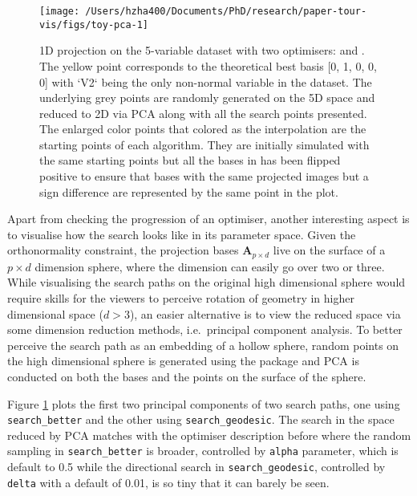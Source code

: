 \begin{Schunk}
\begin{figure}

{\centering \texttt{[image: /Users/hzha400/Documents/PhD/research/paper-tour-vis/figs/toy-pca-1]} 

}

\caption{1D projection on the 5-variable dataset  with two optimisers:  and . The yellow point corresponds to the theoretical best basis [0, 1, 0, 0, 0] with `V2` being the only non-normal variable in the dataset.  The underlying grey points are randomly generated on the 5D space and reduced to 2D via PCA along with all the search points presented. The enlarged color points that colored as the interpolation are the starting points of each algorithm. They are initially simulated with the same starting points but all the bases in  has been flipped positive to ensure that bases with the same projected images but a sign difference are represented by the same point in the plot.}\label{fig:toy-pca}
\end{figure}
\end{Schunk}

Apart from checking the progression of an optimiser, another interesting
aspect is to visualise how the search looks like in its parameter space.
Given the orthonormality constraint, the projection bases
\(\mathbf{A}_{p \times d}\) live on the surface of a \(p \times d\)
dimension sphere, where the dimension can easily go over two or three.
While visualising the search paths on the original high dimensional
sphere would require skills for the viewers to perceive rotation of
geometry in higher dimensional space (\(d > 3\)), an easier alternative
is to view the reduced space via some dimension reduction methods,
i.e.~principal component analysis. To better perceive the search path as
an embedding of a hollow sphere, random points on the high dimensional
sphere is generated using the package  \citep{geozoo}
and PCA is conducted on both the bases and the points on the surface of
the sphere.

Figure \ref{fig:toy-pca} plots the first two principal components of two
search paths, one using \texttt{search\_better} and the other using
\texttt{search\_geodesic}. The search in the space reduced by PCA
matches with the optimiser description before where the random sampling
in \texttt{search\_better} is broader, controlled by \texttt{alpha}
parameter, which is default to 0.5 while the directional search in
\texttt{search\_geodesic}, controlled by \texttt{delta} with a default
of 0.01, is so tiny that it can barely be seen.

